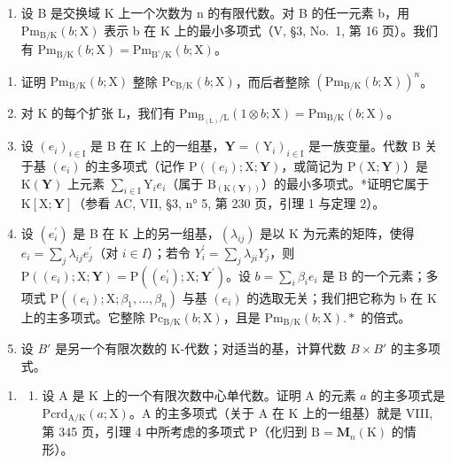 \begin{enumerate}
\def\labelenumi{\arabic{enumi})}
\setcounter{enumi}{1}
\tightlist
\item
  设 B 是交换域 K 上一个次数为 n 的有限代数。对 B 的任一元素 b，用 \(\mathrm{Pm}_{\mathrm{B}/\mathrm{K}}(b;\mathrm{X})\) 表示 b 在 K 上的最小多项式（V, §3, No.~1, 第 16 页）。我们有 \(\mathrm{Pm}_{\mathrm{B}/\mathrm{K}}(b;\mathrm{X})=\mathrm{Pm}_{\mathrm{B}^{\circ}/\mathrm{K}}(b;\mathrm{X})\)。
\end{enumerate}

\begin{enumerate}
\def\labelenumi{\alph{enumi})}
\item
  证明 \(\mathrm{Pm}_{\mathrm{B / K}}(b;\mathrm{X})\) 整除 \(\mathrm{Pc}_{\mathrm{B / K}}(b;\mathrm{X})\)，而后者整除 \((\mathrm{Pm}_{\mathrm{B / K}}(b;\mathrm{X}))^n\)。
\item
  对 K 的每个扩张 L，我们有 \(\mathrm{Pm}_{\mathrm{B}_{(\mathrm{L})}/\mathrm{L}}(1 \otimes b; \mathrm{X}) = \mathrm{Pm}_{\mathrm{B}/\mathrm{K}}(b; \mathrm{X})\)。
\item
  设 \((e_i)_{i\in \mathrm{I}}\) 是 B 在 K 上的一组基，\(\mathbf{Y} = (\mathrm{Y}_i)_{i\in \mathrm{I}}\) 是一族变量。代数 B 关于基 \((e_i)\) 的主多项式（记作 \(\mathrm{P}((e_i);\mathrm{X};\mathbf{Y})\)，或简记为 \(\mathrm{P}(\mathrm{X};\mathbf{Y})\)）是 \(\mathrm{K}(\mathbf{Y})\) 上元素 \(\sum_{i\in \mathrm{I}}\mathrm{Y}_i e_i\)（属于 \(\mathrm{B}_{(\mathrm{K}(\mathbf{Y}))}\)）的最小多项式。*证明它属于 \(\mathrm{K}[\mathrm{X};\mathbf{Y}]\)（参看 AC, VII, §3, n° 5, 第 230 页，引理 1 与定理 2）。
\item
  设 \((e_{i}^{\prime})\) 是 B 在 K 上的另一组基，\((\lambda_{ij})\) 是以 K 为元素的矩阵，使得 \(e_{i} = \sum_{j} \lambda_{ij} e_{j}^{\prime}\)（对 \(i \in I\)）；若令 \(Y_{i}^{\prime} = \sum_{j} \lambda_{ji} Y_{j}\)，则 \(\mathrm{P}((e_{i}); \mathrm{X}; \mathbf{Y}) = \mathrm{P}((e_{i}^{\prime}); \mathrm{X}; \mathbf{Y}^{\prime})\)。设 \(b = \sum_{i} \beta_{i} e_{i}\) 是 B 的一个元素；多项式 \(\mathrm{P}((e_{i}); \mathrm{X}; \beta_{1}, \ldots, \beta_{n})\) 与基 \((e_{i})\) 的选取无关；我们把它称为 b 在 K 上的主多项式。它整除 \(\mathrm{Pc}_{\mathrm{B/K}}(b; \mathrm{X})\)，且是 \(\mathrm{Pm}_{\mathrm{B/K}}(b; \mathrm{X}).*\) 的倍式。
\item
  设 \(B'\) 是另一个有限次数的 K-代数；对适当的基，计算代数 \(B \times B'\) 的主多项式。
\end{enumerate}

\begin{enumerate}
\def\labelenumi{\arabic{enumi})}
\setcounter{enumi}{2}
\tightlist
\item
  \begin{enumerate}
  \def\labelenumii{\alph{enumii})}
  \tightlist
  \item
    设 A 是 K 上的一个有限次数中心单代数。证明 A 的元素 \(a\) 的主多项式是 \(\mathrm{Pcrd}_{\mathrm{A} / \mathrm{K}}(a; \mathrm{X})\)。A 的主多项式（关于 A 在 K 上的一组基）就是 VIII, 第 345 页，引理 4 中所考虑的多项式 P（化归到 \(\mathrm{B} = \mathbf{M}_n(\mathrm{K})\) 的情形）。
  \end{enumerate}
\end{enumerate}

